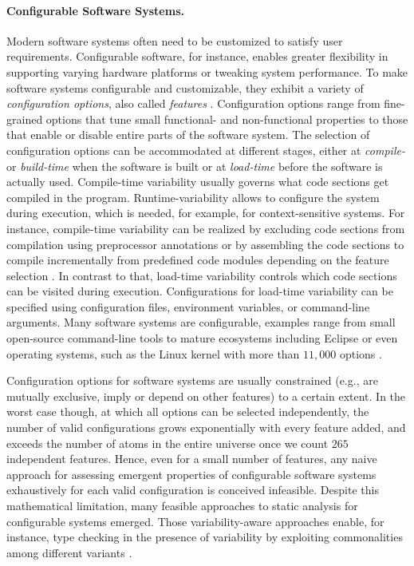 \paragraph{Configurable Software Systems.}
Modern software systems often need to
be customized to satisfy user requirements. Configurable software, for instance,
enables greater flexibility in supporting varying hardware platforms or tweaking
system performance. To make software systems configurable and customizable, they
exhibit a variety of \emph{configuration options}, also called
\emph{features} \citep{apel_feature-oriented_2013}.
Configuration options range from fine-grained options that tune small
functional- and non-functional properties to those that enable or disable entire
parts of the software system. The selection of configuration options can be
accommodated at different stages, either at \emph{compile-} or \emph{build-time}
when the software is built or at \emph{load-time} before the software is actually used.
Compile-time variability usually governs what code sections get
compiled in the program. 
Runtime-variability allows to configure the system during execution, which is
needed, for example, for context-sensitive systems. For instance, compile-time variability can be
realized by excluding code sections from compilation using preprocessor
annotations \citep{hunsen_preprocessor-based_2016} or by assembling the code
sections to compile incrementally from predefined code modules depending on the
feature selection \citep{schaefer_delta-oriented_2010}. In contrast to that,
load-time variability controls which code sections can be visited during execution. Configurations for
load-time variability can be specified using
configuration files, environment variables, or command-line arguments.
Many software systems are configurable, examples range from small open-source
command-line tools to mature ecosystems including Eclipse or even operating
systems, such as the Linux kernel with more than $11,000$ options
\citep{dietrich_robust_2012}.

Configuration options for
software systems are usually constrained (e.g., are mutually exclusive, imply
or depend on other features) to a certain extent. In the worst case though,
at which all options can be selected independently, the number of valid
configurations grows exponentially with every feature added, and exceeds
the number of atoms in the entire universe once we count $265$ independent
features. Hence, even for a small number of features, any naive approach for
assessing emergent properties of configurable software systems exhaustively for
each valid configuration is conceived infeasible. Despite this
mathematical limitation, many feasible approaches to static analysis for
configurable systems emerged. Those variability-aware approaches enable, for
instance, type checking in the presence of variability by exploiting
commonalities among different variants \citep{thum_classification_2014}.

